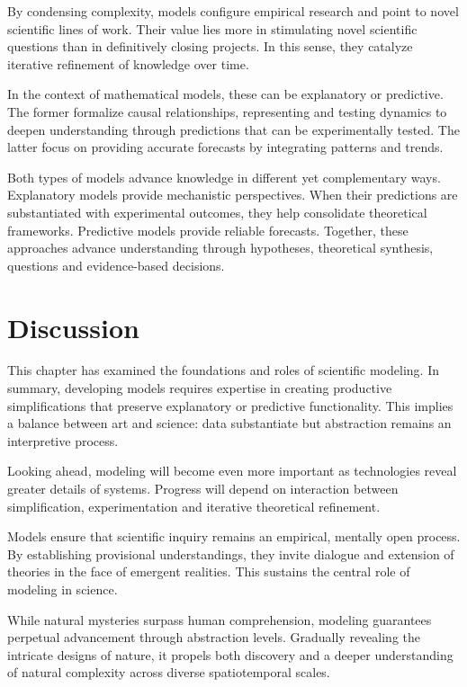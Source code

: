 By condensing complexity, models configure empirical research and point to novel scientific lines of work. Their value lies more in stimulating novel scientific questions than in definitively closing projects. In this sense, they catalyze iterative refinement of knowledge over time.

In the context of mathematical models, these can be explanatory or predictive. The former formalize causal relationships, representing and testing dynamics to deepen understanding through predictions that can be experimentally tested. The latter focus on providing accurate forecasts by integrating patterns and trends.

Both types of models advance knowledge in different yet complementary ways. Explanatory models provide mechanistic perspectives. When their predictions are substantiated with experimental outcomes, they help consolidate theoretical frameworks. Predictive models provide reliable forecasts. Together, these approaches advance understanding through hypotheses, theoretical synthesis, questions and evidence-based decisions.

\section{Discussion}
This chapter has examined the foundations and roles of scientific modeling. In summary, developing models requires expertise in creating productive simplifications that preserve explanatory or predictive functionality. This implies a balance between art and science: data substantiate but abstraction remains an interpretive process.

Looking ahead, modeling will become even more important as technologies reveal greater details of systems. Progress will depend on interaction between simplification, experimentation and iterative theoretical refinement.

Models ensure that scientific inquiry remains an empirical, mentally open process. By establishing provisional understandings, they invite dialogue and extension of theories in the face of emergent realities. This sustains the central role of modeling in science.

While natural mysteries surpass human comprehension, modeling guarantees perpetual advancement through abstraction levels. Gradually revealing the intricate designs of nature, it propels both discovery and a deeper understanding of natural complexity across diverse spatiotemporal scales.
